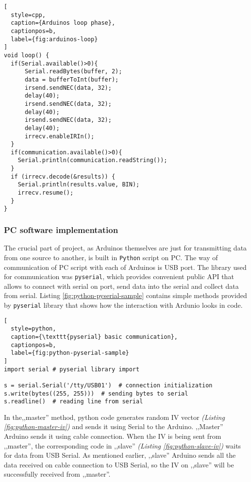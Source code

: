 \begin{minipage}{\linewidth}
\begin{lstlisting}[
  style=cpp,
  caption={Arduinos loop phase},
  captionpos=b,
  label={fig:arduinos-loop}
]
void loop() {
  if(Serial.available()>0){
      Serial.readBytes(buffer, 2);
      data = bufferToInt(buffer);
      irsend.sendNEC(data, 32);
      delay(40);
      irsend.sendNEC(data, 32);
      delay(40);
      irsend.sendNEC(data, 32);
      delay(40);
      irrecv.enableIRIn();
  }
  if(communication.available()>0){
    Serial.println(communication.readString());
  }
  if (irrecv.decode(&results)) {
    Serial.println(results.value, BIN);
    irrecv.resume();
  }
}
\end{lstlisting}
\end{minipage}

\subsubsection{PC software implementation}
The crucial part of project, as Arduinos themselves are just for transmitting data from one source to another, is built in \texttt{Python} script on PC. The way of communication of PC script with each of Arduinos is USB port. The library used for communication was \texttt{pyserial}, which provides convenient public API that allows to connect with serial on port, send data into the serial and collect data from serial. Listing \ref{fig:python-pyserial-sample} contains simple methods provided by \texttt{pyserial} library that shows how the interaction with Ardunio looks in code.

\begin{lstlisting}[
  style=python,
  caption={\texttt{pyserial} basic communication},
  captionpos=b,
  label={fig:python-pyserial-sample}
]
import serial # pyserial library import

s = serial.Serial('/tty/USB01')  # connection initialization
s.write(bytes((255, 255)))  # sending bytes to serial
s.readline()  # reading line from serial
\end{lstlisting}

In the,,master'' method, python code generates random IV vector \textit{(Listing \ref{fig:python-master-iv})} and sends it using Serial to the Arduino. ,,Master'' Arduino sends it using cable connection. When the IV is being sent from ,,master'', the corresponding code in ,,slave'' \textit{(Listing \ref{fig:python-slave-iv})} waits for data from USB Serial. As mentioned earlier, ,,slave'' Arduino sends all the data received on cable connection to USB Serial, so the IV on ,,slave'' will be successfully received from ,,master''.

